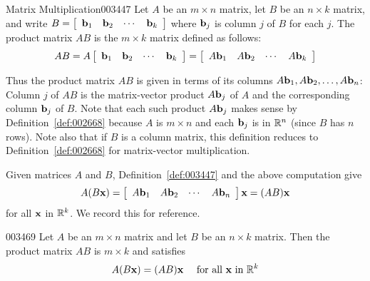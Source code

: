 \begin{definition}{Matrix Multiplication}{003447}
Let $A$ be an $m \times n$ matrix, let $B$ be an $n \times k$ matrix, and write $B = \left[ \begin{array}{cccc}
\textbf{b}_{1} & \textbf{b}_{2} & \cdots & \textbf{b}_{k}
\end{array} \right]$ where $\textbf{b}_{j}$ is column $j$ of $B$ for each $j$. The product matrix $AB$ is the $m \times k$ matrix defined as follows:
\begin{equation*}
AB = A \left[ \begin{array}{cccc} \textbf{b}_{1} & \textbf{b}_{2} & \cdots & \textbf{b}_{k} \end{array} \right] = \left[ \begin{array}{cccc} A\textbf{b}_{1} & A\textbf{b}_{2} & \cdots & A\textbf{b}_{k} \end{array} \right]
\end{equation*}
\end{definition}

\noindent Thus the product matrix $AB$ is given in terms of its columns $A\textbf{b}_{1}, A\textbf{b}_{2}, \dots, A\textbf{b}_{n}$: Column $j$ of $AB$ is the matrix-vector product $A\textbf{b}_{j}$ of $A$ and the corresponding column $\textbf{b}_{j}$ of $B$. Note that each such product $A\textbf{b}_{j}$ makes sense by Definition~\ref{def:002668} because $A$ is $m \times n$ and each $\textbf{b}_{j}$ is in $\mathbb{R}^n$ (since $B$ has $n$ rows). Note also that if $B$ is a column matrix, this definition reduces to Definition~\ref{def:002668} for matrix-vector multiplication.


Given matrices $A$ and $B$, Definition~\ref{def:003447} and the above computation give
\begin{equation*}
A(B\textbf{x}) = \left[ \begin{array}{cccc}
A\textbf{b}_{1} & A\textbf{b}_{2} & \cdots & A\textbf{b}_{n}
\end{array} \right] \textbf{x} = (AB)\textbf{x}
\end{equation*}
for all $\textbf{x}$ in $\mathbb{R}^k$. We record this for reference.


\begin{theorem}{}{003469}
Let $A$ be an $m \times n$ matrix and let $B$ be an $n \times k$ matrix. Then the product matrix $AB$ is $m \times k$ and satisfies
\begin{equation*}
A(B\textbf{x}) = (AB)\textbf{x} \quad \mbox{ for all } \textbf{x} \mbox{ in } \mathbb{R}^{k}
\end{equation*}
\end{theorem}

